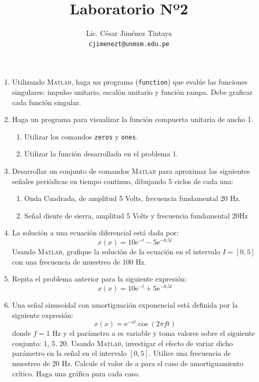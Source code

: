 \documentclass[a4paper,11pt,twoside,final]{article}
\begin{document}
    \title{Laboratorio Nº2}
    \author{Lic. César Jiménez Tintaya\\ \small{\texttt{cjimenezt@unmsm.edu.pe}}}
    \date{}
    \maketitle

    \begin{enumerate}
        \item Utilizando \textsc{Matlab}, haga un programa (\texttt{function}) que evalúe las
        funciones singulares: impulso unitario, escalón unitario y función
        rampa. Debe graficar cada función singular.

        \item Haga un programa para visualizar la función compuerta unitaria de ancho 1.
        \begin{enumerate}
            \item Utilizar los comandos \texttt{zeros} y \texttt{ones}.
            \item Utilizar la función desarrollada en el problema 1.
        \end{enumerate}

        \item Desarrollar un conjunto de comandos \textsc{Matlab} para aproximar las
        siguientes señales periódicas en tiempo continuo, dibujando 5 ciclos
        de cada una:
        \begin{enumerate}
            \item Onda Cuadrada, de amplitud 5 Volts, frecuencia fundamental 20 Hz.
            \item Señal diente de sierra, amplitud 5 Volts y frecuencia fundamental 20Hz
        \end{enumerate}

        \item La solución a una ecuación diferencial está dada por:
        $$x\left(x\right) = 10\mathrm{e}^{-t} - 5\mathrm{e}^{-0.5t}$$
        Usando \textsc{Matlab}, grafique la solución de la ecuación en el intervalo
        $I=\left[0,5\right]$ con una frecuencia de muestreo de 100 Hz.

        \item  Repita el problema anterior para la siguiente expresión:
        $$x\left(x\right) = 10\mathrm{e}^{-t} + 5\mathrm{e}^{-0.5t}$$

        \item Una señal sinusoidal con amortiguación exponencial está definida
        por la siguiente expresión:
        $$x\left(x\right) = \mathrm{e}^{-at}\cos\left(2\pi f t\right)$$
        donde $f = 1$ Hz y el parámetro a es variable y toma valores sobre el
        siguiente conjunto: 1, 5, 20. Usando \textsc{Matlab}, investigar el
        efecto de variar dicho parámetro en la señal en el intervalo $[0, 5]$.
        Utilice una frecuencia de muestreo de 20 Hz. Calcule el valor de a
        para el caso de amortiguamiento crítico. Haga una gráfica para cada
        caso.


\end{enumerate}
\end{document}
